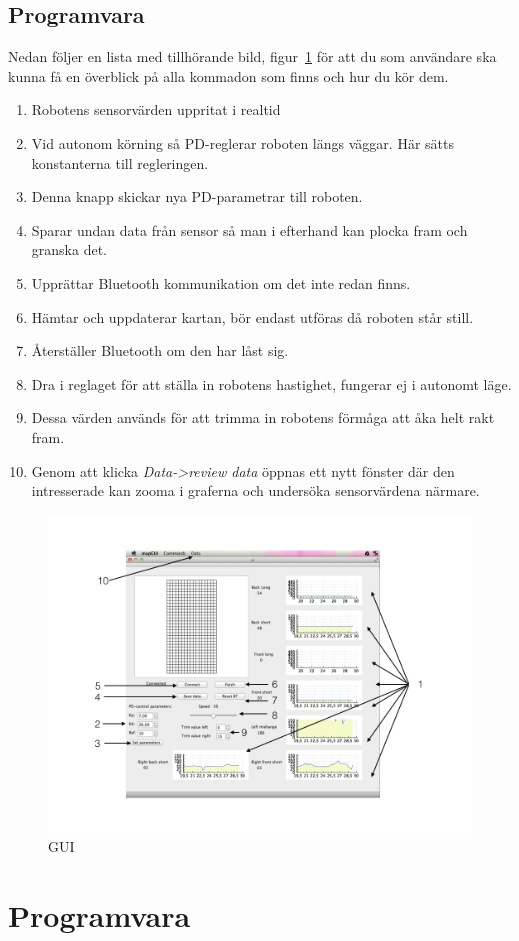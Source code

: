 \documentclass[a4paper,12pt,fleqn]{article}
\begin{document}
\subsection{Programvara}
Nedan följer en lista med tillhörande bild, figur~\ref{fig:gui_man} för att du som användare ska kunna få en överblick på alla kommadon som finns och hur du kör dem. 

\begin{enumerate}
	\item Robotens sensorvärden uppritat i realtid  
	\item Vid autonom körning så PD-reglerar roboten längs väggar. Här sätts konstanterna till regleringen.
	\item Denna knapp skickar nya PD-parametrar till roboten.
	\item Sparar undan data från sensor så man i efterhand kan plocka fram och granska det. 
	\item Upprättar Bluetooth kommunikation om det inte redan finns.
	\item Hämtar och uppdaterar kartan, bör endast utföras då roboten står still.
	\item Återställer Bluetooth om den har låst sig.
	\item Dra i reglaget för att ställa in robotens hastighet, fungerar ej i autonomt läge.
	\item Dessa värden används för att trimma in robotens förmåga att åka helt rakt fram. 
	\item Genom att klicka \emph{Data->review data} öppnas ett nytt fönster där den intresserade kan zooma i graferna och undersöka sensorvärdena närmare.  
\end{enumerate}	


\begin{figure}[htp] %
  \begin{center}
  \includegraphics[keepaspectratio=true,width=1\textwidth]{bilder/Gui_manual.png}  %
  \end{center}
  \caption{GUI} %
  \label{fig:gui_man} %
\end{figure}

\section{Programvara}

\lstset{language=C++}



\end{document}
